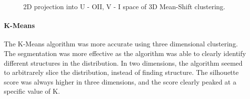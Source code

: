 \begin{figure}
\centering
{}
\hfill
{}
\caption{2D projection into U - OII, V - I space of 3D Mean-Shift clustering.}
\label{fig:OII_3DMS}
\end{figure}

\paragraph{K-Means}
The K-Means algorithm was more accurate using three dimensional clustering. 
The segmentation was more effective as the algorithm was able to clearly identify different structures in the distribution. 
In two dimensions, the algorithm seemed to arbitrarely slice the distribution, instead of finding structure.
The silhouette score was always higher in three dimensions, and the score clearly peaked at a specific value of K.

